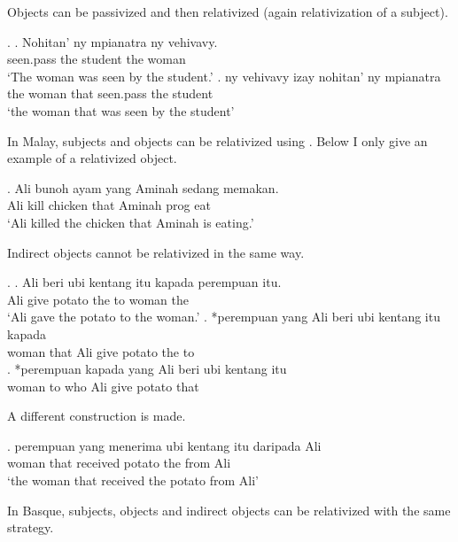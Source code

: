 Objects can be passivized and then relativized (again relativization of a subject).

\ex.
\ag. Nohitan' ny mpianatra ny vehivavy.\\
 seen.\ac{pass} the student the woman\\
 `The woman was seen by the student.'
\bg. ny vehivavy izay nohitan' ny mpianatra\\
 the woman that seen.\ac{pass} the student\\
 `the woman that was seen by the student' 

In Malay, subjects and objects can be relativized using . Below I only give an example of a relativized object.

\exg. Ali bunoh ayam yang Aminah sedang memakan.\\
 Ali kill chicken that Aminah \ac{prog} eat\\
 `Ali killed the chicken that Aminah is eating.' 

Indirect objects cannot be relativized in the same way.

\ex.
\ag. Ali beri {ubi kentang} itu kapada perempuan itu.\\
 Ali give potato the to woman the\\
 `Ali gave the potato to the woman.'
\bg. *perempuan yang Ali beri {ubi kentang} itu kapada\\
 woman that Ali give potato the to\\
\bg. *perempuan kapada yang Ali beri {ubi kentang} itu\\
 woman to who Ali give potato that\\ 

A different construction is made.

\exg. perempuan yang menerima {ubi kentang} itu daripada Ali\\
 woman that received potato the from Ali\\
 `the woman that received the potato from Ali'

In Basque, subjects, objects and indirect objects can be relativized with the same strategy.

